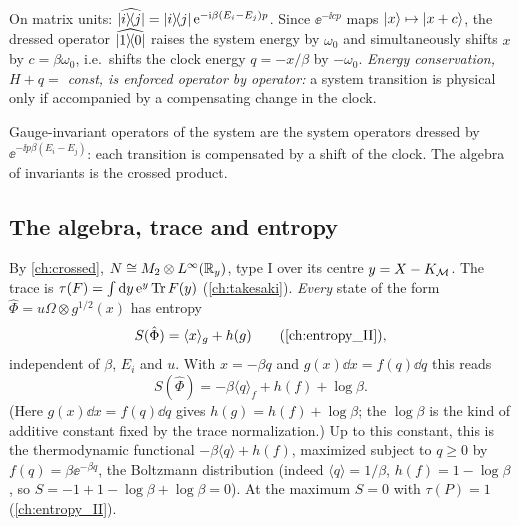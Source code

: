 On matrix units: $\widehat{\lvert i\rangle\!\langle j\rvert}=\lvert i\rangle\!\langle j\rvert\,\mathrm{e}^{-\mathrm{i}\beta(E_i-E_j)p}$. Since $\ee^{-\ii cp}$ maps $\lvert x\rangle\mapsto\lvert x+c\rangle$, the dressed operator $\widehat{\lvert 1\rangle\!\langle 0\rvert}$ raises the system energy by $\omega_0$ and simultaneously shifts $x$ by $c=\beta\omega_0$, i.e.\ shifts the clock energy $q=-x/\beta$ by $-\omega_0$. \emph{Energy conservation, $H+q=$ const, is enforced operator by operator:} a system transition is physical only if accompanied by a compensating change in the clock.

\begin{keyidea}
Gauge-invariant operators of the system are the system operators dressed by $\ee^{-\ii p\beta(E_i-E_j)}$: each transition is compensated by a shift of the clock. The algebra of invariants is the crossed product.
\end{keyidea}

\subsection{The algebra, trace and entropy}

By \cref{ch:crossed}, $N\cong M_2\otimes L^\infty(\mathbb{R}_y)$, type I over its centre $y=X-K_{\mathcal{M}}$. The trace is $\tau(F)=\int\mathrm{d} y\,\mathrm{e}^{y}\operatorname{Tr} F(y)$ (\cref{ch:takesaki}). \emph{Every} state of the form $\hat\Phi=u\Omega\otimes g^{1/2}(x)$ has entropy
\begin{equation}
S(\hat\Phi)=\langle x\rangle_g+h(g)\qquad(\text{\cref{ch:entropy_II}}),
\end{equation}
independent of $\beta$, $E_i$ and $u$. With $x=-\beta q$ and $g(x)\dd x=f(q)\dd q$ this reads
\begin{equation}
S(\hat\Phi)=-\beta\langle q\rangle_f+h(f)+\log\beta.
\end{equation}
(Here $g(x)\dd x=f(q)\dd q$ gives $h(g)=h(f)+\log\beta$; the $\log\beta$ is the kind of additive constant fixed by the trace normalization.) Up to this constant, this is the thermodynamic functional $-\beta\langle q\rangle+h(f)$, maximized subject to $q\ge0$ by $f(q)=\beta\ee^{-\beta q}$, the Boltzmann distribution (indeed $\langle q\rangle=1/\beta$, $h(f)=1-\log\beta$, so $S=-1+1-\log\beta+\log\beta=0$). At the maximum $S=0$ with $\tau(P)=1$ (\cref{ch:entropy_II}).

